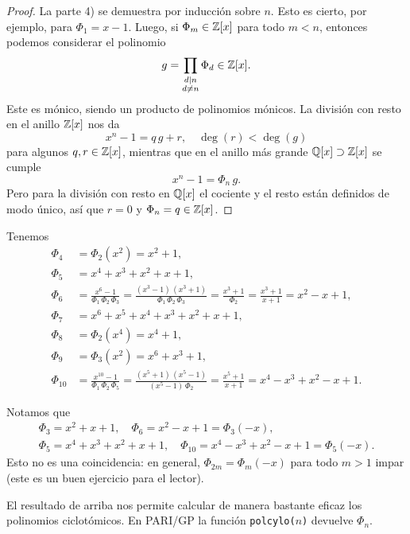 \begin{proposicion}
\begin{proof}
    La parte 4) se demuestra por inducción sobre $n$. Esto es cierto, por
    ejemplo, para $\Phi_1 = x-1$. Luego, si $\Phi_m \in \mathbb{Z} [x]$ para todo
    $m < n$, entonces podemos considerar el polinomio
    $$g = \prod_{\substack{d\mid n \\ d\ne n}} \Phi_d \in \mathbb{Z} [x].$$
    Este es mónico, siendo un producto de polinomios mónicos. La división con
    resto en el anillo $\mathbb{Z} [x]$ nos da
    $$x^n - 1 = q\,g + r, \quad \deg (r) < \deg (g)$$
    para algunos $q, r \in \mathbb{Z} [x]$, mientras que en el anillo más grande
    $\mathbb{Q} [x] \supset \mathbb{Z} [x]$ se cumple
    $$x^n - 1 = \Phi_n\,g.$$
    Pero para la división con resto en $\mathbb{Q} [x]$ el cociente y el resto están
    definidos de modo único, así que $r = 0$ y $\Phi_n = q \in \mathbb{Z}[x]$.
  \end{proof}
\end{proposicion}

\begin{ejemplo}
  Tenemos
  \begin{align*}
    \Phi_4 & = \Phi_2 (x^2) = x^2 + 1,\\
    \Phi_5 & = x^4 + x^3 + x^2 + x + 1,\\
    \Phi_6 & = \frac{x^6 - 1}{\Phi_1\,\Phi_2\,\Phi_3} = \frac{(x^3-1)\,(x^3+1)}{\Phi_1\,\Phi_2\,\Phi_3} = \frac{x^3+1}{\Phi_2} = \frac{x^3+1}{x+1} = x^2 - x + 1,\\
    \Phi_7 & = x^6 + x^5 + x^4 + x^3 + x^2 + x + 1,\\
    \Phi_8 & = \Phi_2 (x^4) = x^4 + 1,\\
    \Phi_9 & = \Phi_3 (x^2) = x^6 + x^3 + 1,\\
    \Phi_{10} & = \frac{x^{10}-1}{\Phi_1\,\Phi_2\,\Phi_5} = \frac{(x^5+1)\,(x^5-1)}{(x^5-1)\,\Phi_2} = \frac{x^5+1}{x+1} = x^4 - x^3 + x^2 - x + 1.
  \end{align*}

  Notamos que
  \begin{gather*}
    \Phi_3 = x^2 + x + 1, \quad \Phi_6 = x^2 - x + 1 = \Phi_3 (-x),\\
    \Phi_5 = x^4 + x^3 + x^2 + x + 1, \quad \Phi_{10} = x^4 - x^3 + x^2 - x + 1 = \Phi_5 (-x).
  \end{gather*}
  Esto no es una coincidencia: en general, $\Phi_{2m} = \Phi_m (-x)$ para todo
  $m > 1$ impar (este es un buen ejercicio para el lector).
\end{ejemplo}

El resultado de arriba nos permite calcular de manera bastante eficaz los
polinomios ciclotómicos. En PARI/GP la función \texttt{polcylo($n$)} devuelve
$\Phi_n$.

